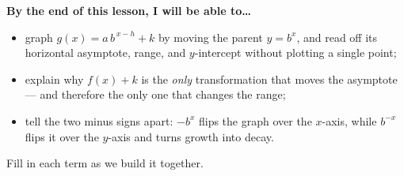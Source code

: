 \documentclass[10pt]{article}
\begin{document}
\namedateperiod

\vspace{0.08in}

\begin{objectivebox}
\textbf{By the end of this lesson, I will be able to\dots}
\begin{itemize}\setlength{\itemsep}{2pt}
  \item graph $g(x)=a\,b^{\,x-h}+k$ by moving the parent $y=b^{x}$, and read off its horizontal asymptote, range, and $y$-intercept without plotting a single point;
  \item explain why $f(x)+k$ is the \emph{only} transformation that moves the asymptote --- and therefore the only one that changes the range;
  \item tell the two minus signs apart: $-b^{x}$ flips the graph over the $x$-axis, while $b^{-x}$ flips it over the $y$-axis and turns growth into decay.
\end{itemize}
\end{objectivebox}

\vspace{0.05in}

\begin{vocabbox}
\small
Fill in each term as we build it together.
\par\vspace{2pt}   %
\end{vocabbox}
\end{document}
